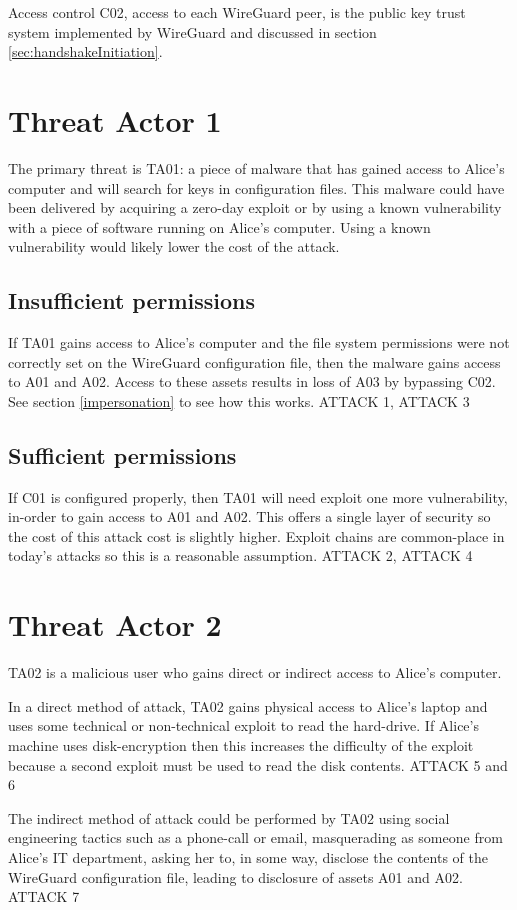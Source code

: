 \documentclass [11pt, proquest] {uwthesis}[2020/02/24]
\begin{document}
Access control C02, access to each WireGuard peer, is the public key trust system implemented by WireGuard and discussed in section \ref{sec:handshakeInitiation}.

\section{Threat Actor 1}
The primary threat is TA01: a piece of malware that has gained access to Alice's computer and will search for keys in configuration files. This malware could have been delivered by acquiring a zero-day exploit or by using a known vulnerability with a piece of software running on Alice's computer. Using a known vulnerability would likely lower the cost of the attack.


\subsection{Insufficient permissions}
If TA01 gains access to Alice's computer and the file system permissions were not correctly set on the WireGuard configuration file, then the malware gains access to A01 and A02. Access to these assets results in loss of A03 by bypassing C02. See section \ref{impersonation} to see how this works. 
ATTACK 1, ATTACK 3

\subsection{Sufficient permissions}
If C01 is configured properly, then TA01 will need exploit one more vulnerability, in-order to gain access to A01 and A02. This offers a single layer of security so the cost of this attack cost is slightly higher. Exploit chains are common-place in today's attacks so this is a reasonable assumption.  ATTACK 2, ATTACK 4

\section{Threat Actor 2}
TA02 is a malicious user who gains direct or indirect access to Alice's computer.  

In a direct method of attack, TA02 gains physical access to Alice's laptop and uses some technical or non-technical exploit to read the hard-drive. If Alice's machine uses disk-encryption then this increases the difficulty of the exploit because a second exploit must be used to read the disk contents.
ATTACK 5 and 6

The indirect method of attack could be performed by TA02 using social engineering tactics such as a phone-call or email, masquerading as someone from Alice's IT department, asking her to, in some way, disclose the contents of the WireGuard configuration file, leading to disclosure of assets A01 and A02.
ATTACK 7
\end{document}
